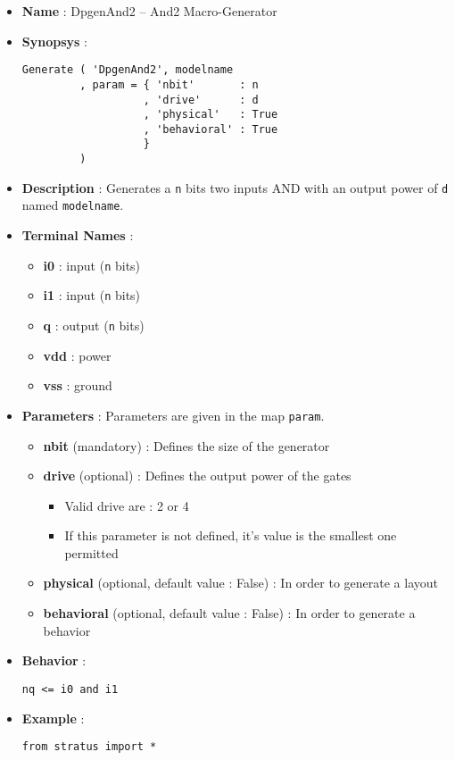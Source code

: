 \begin{itemize}
    \item \textbf{Name} : DpgenAnd2 -- And2 Macro-Generator
    \item \textbf{Synopsys} :
\begin{verbatim}
Generate ( 'DpgenAnd2', modelname
         , param = { 'nbit'       : n
                   , 'drive'      : d
                   , 'physical'   : True
                   , 'behavioral' : True
                   }
         )
\end{verbatim}
    \item \textbf{Description} : Generates a \verb-n- bits two inputs AND with an output power of \verb-d- named \verb-modelname-.
    \item \textbf{Terminal Names} :
    \begin{itemize}
        \item \textbf{i0} : input (\verb-n- bits)
        \item \textbf{i1} : input (\verb-n- bits)
        \item \textbf{q} : output (\verb-n- bits)
        \item \textbf{vdd} : power
        \item \textbf{vss} : ground
    \end{itemize}
    \item \textbf{Parameters} : Parameters are given in the map \verb-param-.
    \begin{itemize}
        \item \textbf{nbit} (mandatory) : Defines the size of the generator
        \item \textbf{drive} (optional) : Defines the output power of the gates
        \begin{itemize}
            \item Valid drive are : 2 or 4
            \item If this parameter is not defined, it's value is the smallest one permitted
        \end{itemize}
        \item \textbf{physical} (optional, default value : False) : In order to generate a layout
        \item \textbf{behavioral} (optional, default value : False) : In order to generate a behavior
    \end{itemize}
    \item \textbf{Behavior} :
\begin{verbatim}
nq <= i0 and i1
\end{verbatim}
    \item \textbf{Example} :
\begin{verbatim}
from stratus import *


\end{verbatim}
\end{itemize}
